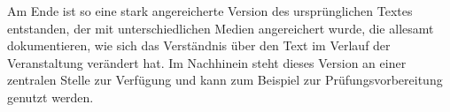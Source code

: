   Am Ende ist so eine stark angereicherte Version des ursprünglichen Textes entstanden, der mit unterschiedlichen Medien angereichert wurde, die allesamt dokumentieren, wie sich das Verständnis über den Text im Verlauf der Veranstaltung verändert hat. Im Nachhinein steht dieses Version an einer zentralen Stelle zur Verfügung und kann zum Beispiel zur Prüfungsvorbereitung genutzt werden.
 
% 
% 
% 
% 
% 
% 
% 
% 
% 
% 
% 
% 
% 
% 
% 
% 

